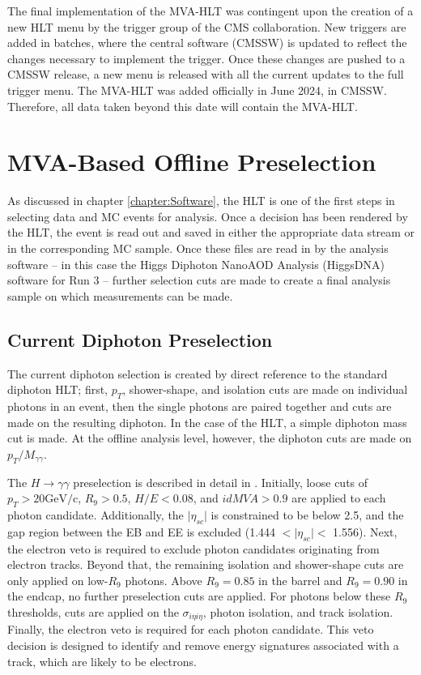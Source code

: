 \documentclass[12pt]{ucsddissertation}
\begin{document}
The final implementation of the MVA-HLT was contingent upon the creation of a new HLT menu by the trigger group of the CMS collaboration. New triggers are added in batches, where the central software (CMSSW) is updated to reflect the changes necessary to implement the trigger. Once these changes are pushed to a CMSSW release, a new menu is released with all the current updates to the full trigger menu. The MVA-HLT was added officially in June 2024, in CMSSW. Therefore, all data taken beyond this date will contain the MVA-HLT.

\chapter{MVA-Based Offline Preselection} \label{chapter:OfflineSelection}
As discussed in chapter \ref{chapter:Software}, the HLT is one of the first steps in selecting data and MC events for analysis. Once a decision has been rendered by the HLT, the event is read out and saved in either the appropriate data stream or in the corresponding MC sample. Once these files are read in by the analysis software -- in this case the Higgs Diphoton NanoAOD Analysis (HiggsDNA) software for Run 3 -- further selection cuts are made to create a final analysis sample on which measurements can be made. 

\section{Current Diphoton Preselection}\label{sec:StandardPresel}
The current diphoton selection is created by direct reference to the standard diphoton HLT; first, $p_T$, shower-shape, and isolation cuts are made on individual photons in an event, then the single photons are paired together and cuts are made on the resulting diphoton. In the case of the HLT, a simple diphoton mass cut is made. At the offline analysis level, however, the diphoton cuts are made on $p_T/M_{\gamma \gamma}$. 

The $H \rightarrow \gamma \gamma$ preselection is described in detail in \cite{Run2Hgg2018}. Initially, loose cuts of $p_T > 20 \mathrm{GeV/c}$, $R_9 > 0.5$, $H/E < 0.08$, and $idMVA > 0.9$ are applied to each photon candidate. Additionally, the $ \lvert \eta_{sc} \rvert$ is constrained to be below 2.5, and the gap region between the EB and EE is excluded (1.444 $< \lvert \eta_{sc} \rvert <$ 1.556). Next, the electron veto is required to exclude photon candidates originating from electron tracks. Beyond that, the remaining isolation and shower-shape cuts are only applied on low-$R_9$ photons. Above $R_9 = 0.85$ in the barrel and $R_9 = 0.90$ in the endcap, no further preselection cuts are applied. For photons below these $R_9$ thresholds, cuts are applied on the $\sigma_{i\eta i \eta}$, photon isolation, and track isolation. Finally, the electron veto is required for each photon candidate. This veto decision is designed to identify and remove energy signatures associated with a track, which are likely to be electrons.
\end{document}

